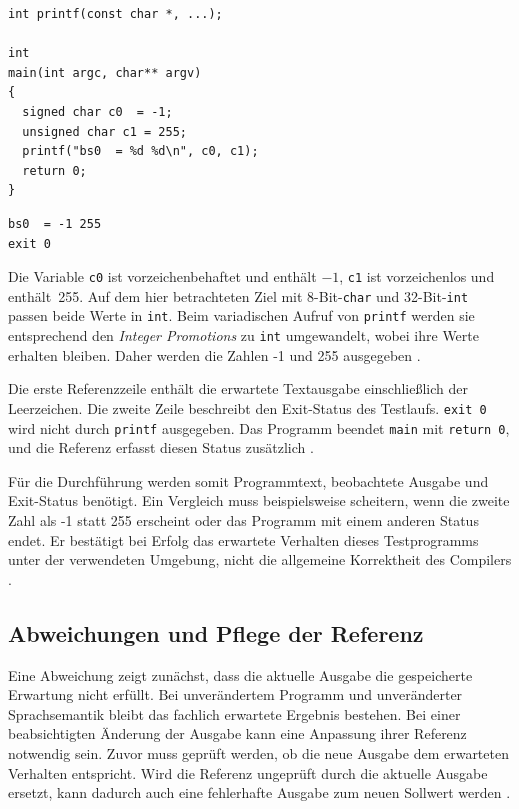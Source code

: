 \documentclass[11pt,a4paper]{article}
\newcommand{\code}[1]{\texttt{#1}}
\begin{document}
\begingroup
\lstset{captionpos=b}
\noindent\begin{minipage}[b]{0.62\textwidth}
\begin{lstlisting}[caption={C-Originalprogramm aus LLVM}]
int printf(const char *, ...);

int
main(int argc, char** argv)
{
  signed char c0  = -1;
  unsigned char c1 = 255;
  printf("bs0  = %d %d\n", c0, c1);
  return 0;
}
\end{lstlisting}
\end{minipage}\hfill
\begin{minipage}[b]{0.32\textwidth}
\begin{lstlisting}[caption={Referenzdatei}]
bs0  = -1 255
exit 0
\end{lstlisting}
\end{minipage}
\endgroup

Die Variable \code{c0} ist vorzeichenbehaftet und enthält $-1$, \code{c1} ist vorzeichenlos und enthält~255. Auf dem hier betrachteten Ziel mit 8-Bit-\code{char} und 32-Bit-\code{int} passen beide Werte in \code{int}. Beim variadischen Aufruf von \code{printf} werden sie entsprechend den \emph{Integer Promotions} zu \code{int} umgewandelt, wobei ihre Werte erhalten bleiben. Daher werden die Zahlen -1 und 255 ausgegeben \parencite{wg14_n1570_2011}.

Die erste Referenzzeile enthält die erwartete Textausgabe einschließlich der Leerzeichen. Die zweite Zeile beschreibt den Exit-Status des Testlaufs. \code{exit 0} wird nicht durch \code{printf} ausgegeben. Das Programm beendet \code{main} mit \code{return 0}, und die Referenz erfasst diesen Status zusätzlich \parencite{goldenc}.

Für die Durchführung werden somit Programmtext, beobachtete Ausgabe und Exit-Status benötigt. Ein Vergleich muss beispielsweise scheitern, wenn die zweite Zahl als -1 statt 255 erscheint oder das Programm mit einem anderen Status endet. Er bestätigt bei Erfolg das erwartete Verhalten dieses Testprogramms unter der verwendeten Umgebung, nicht die allgemeine Korrektheit des Compilers \parencite{goldenc,suiteguide}.

\subsection{Abweichungen und Pflege der Referenz}
Eine Abweichung zeigt zunächst, dass die aktuelle Ausgabe die gespeicherte Erwartung nicht erfüllt. Bei unverändertem Programm und unveränderter Sprachsemantik bleibt das fachlich erwartete Ergebnis bestehen. Bei einer beabsichtigten Änderung der Ausgabe kann eine Anpassung ihrer Referenz notwendig sein. Zuvor muss geprüft werden, ob die neue Ausgabe dem erwarteten Verhalten entspricht. Wird die Referenz ungeprüft durch die aktuelle Ausgabe ersetzt, kann dadurch auch eine fehlerhafte Ausgabe zum neuen Sollwert werden \parencite{suiteguide}.
\end{document}
